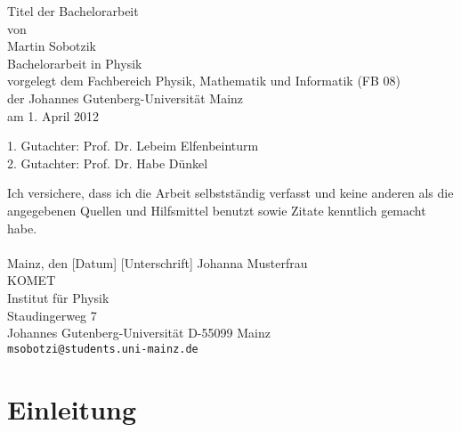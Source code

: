 \documentclass[a4paper,11pt,oneside,final,german,openbib,pdftex]{scrbook}
\begin{document}

\begin{titlepage}
  \vspace*{6mm}
  \begin{center}
     {\afont Titel der Bachelorarbeit}
     \\[3.5cm]
     {\large von}
     \\[3.5cm]
     {\dfont Martin Sobotzik}
     \\[2cm]
     {\large Bachelorarbeit in Physik \/\\
        vorgelegt dem Fachbereich Physik, Mathematik und Informatik (FB 08) \/\\
        der Johannes Gutenberg-Universit\"at Mainz \/\\
        am 1. April 2012}
   \end{center}
   \vfill
   1. Gutachter: Prof. Dr. Lebeim Elfenbeinturm\\	
   2. Gutachter: Prof. Dr. Habe D\"unkel \\
   \vfill
\end{titlepage}

\thispagestyle{empty}
Ich versichere, dass ich die Arbeit selbstst\"andig verfasst und keine 
anderen als die angegebenen Quellen und Hilfsmittel benutzt sowie 
Zitate kenntlich gemacht habe.
\\
\\[3.5cm] 
Mainz, den [Datum] [Unterschrift]
\vfill
\noindent 
Johanna Musterfrau\\
KOMET\\
Institut f\"ur Physik\\
Staudingerweg 7\\
Johannes Gutenberg-Universit\"at
D-55099 Mainz\\
{\tt msobotzi@students.uni-mainz.de}

\renewcommand\contentsname{Inhaltsverzeichnis}
\renewcommand\figurename{Abbildung}
\renewcommand\tablename{Tabelle}
\tableofcontents
\clearpage

\mainmatter
\sloppy

\chapter{Einleitung}
\end{document}
